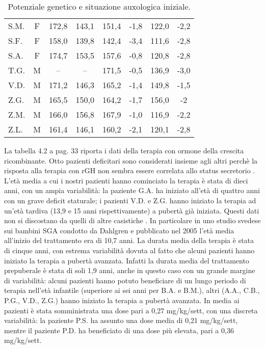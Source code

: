 \begin{table}[!h]
\begin{center}
\begin{tabular}{lccccccc}
S.M.	& F & 172,8 & 143,1 & 151,4 & -1,8 	        	& 122,0 & -2,2  \\
S.F.	& F & 158,0 & 139,8 & 142,4 & -3,4 	  		& 111,6 & -2,8  \\
S.A.	& F & 174,7 & 153,5 & 157,6 & -0,8 	  		& 120,8 & -2,8  \\
T.G.    & M & --    & --    & 171,5 & -0,5    			& 136,9 & -3,0  \\
V.D.	& M & 171,2 & 146,3 & 165,2 & -1,4 	  		& 149,8 & -1,5  \\
Z.G.	& M & 165,5 & 150,0 & 164,2 & -1,7 	  		& 156,0 & -2     \\
Z.M.	& M & 166,0 & 156,8 & 167,9 & -1,0 	  		& 116,9 & -2,2  \\
Z.L.	& M & 161,4 & 146,1 & 160,2 & -2,1 	  		& 120,1 & -2,8  \\
\bottomrule
\end{tabular}
\end{center}
\caption{Potenziale genetico e situazione auxologica iniziale.}
\label{tab:SituazioneIniziale}
\end{table}

La tabella 4.2 a pag. 33 riporta i dati della terapia con ormone della crescita ricombinante. 
Otto pazienti deficitari sono considerati insieme agli altri perchè la risposta alla terapia con rGH non sembra essere correlata allo status secretorio\cite{lee2003international} \cite{de2005growth}.  L'età media a cui i nostri pazienti hanno cominciato la terapia è stata di dieci anni, con un ampia variabilità: la paziente G.A. ha iniziato all'età di quattro anni con un grave deficit staturale; i pazienti V.D. e Z.G. hanno iniziato la terapia ad un'età tardiva (13,9 e 15 anni rispettivamente) a pubertà già iniziata. Questi dati non si discostano da quelli di altre casistiche\cite{coutant1998short} \cite{zucchini2001final}.
In particolare in uno studio svedese sui bambini SGA condotto da Dahlgren e pubblicato nel 2005 l'età media all'inizio del trattamento era di 10,7 anni\cite{dahlgren2005final}.
La durata media della terapia è stata di cinque anni, con estrema variabilità dovuta al fatto che alcuni pazienti hanno iniziato la terapia a pubertà avanzata. Infatti la durata media del trattamento prepuberale è stata di soli 1,9 anni, anche in questo caso con un grande margine di variabilità: alcuni pazienti hanno potuto beneficiare di un lungo periodo di terapia nell'età infantile (superiore ai sei anni per B.A. e B.M.), altri (A.A., C.B., P.G., V.D., Z.G.) hanno iniziato la terapia a pubertà avanzata. 
In media ai pazienti è stata somministrata una dose pari a 0,27 mg/kg/sett, con una discreta variabilità: la paziente P.S. ha assunto una dose media di 0,21 mg/kg/sett, mentre il paziente P.D. ha beneficiato di una dose più elevata, pari a 0,36 mg/kg/sett. 
  
